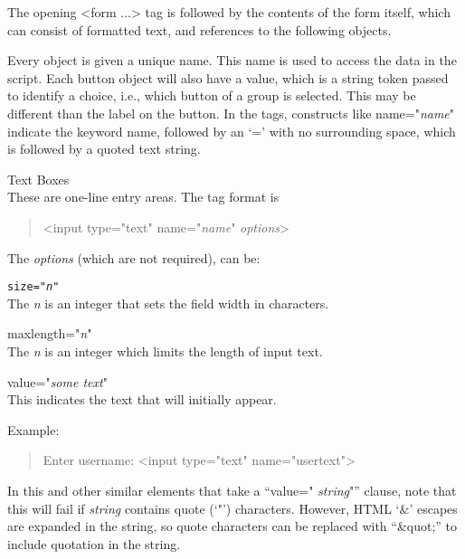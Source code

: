 The opening {\vt <form ...>} tag is followed by the contents of
the form itself, which can consist of formatted text, and references
to the following objects.

Every object is given a unique name.  This name is used to access the
data in the script.  Each button object will also have a value, which
is a string token passed to identify a choice, i.e., which button of a
group is selected.  This may be different than the label on the
button.  In the tags, constructs like {\vt name="{\it name}"} indicate
the keyword {\vt name}, followed by an `{\vt =}' with no surrounding
space, which is followed by a quoted text string.

\begin{description}
\item{Text Boxes}\\
These are one-line entry areas.  The tag format is
\begin{quote}
{\vt <input type="text" name="{\it name\/}" {\it options\/}>}
\end{quote}
The {\it options} (which are not required), can be:
\begin{description}
\item{\tt size="{\it n\/}"}\\
The {\it n} is an integer that sets the field width in characters.
\item{\vt maxlength="{\it n\/}"}\\
The {\it n} is an integer which limits the length of input text.
\item{\vt value="{\it some text\/}"}\\
This indicates the text that will initially appear.
\end{description}

Example:
\begin{quote}
{\vt Enter username: <input type="text" name="usertext">}
\end{quote}
\end{description}

In this and other similar elements that take a ``{\vt value="}{\it
string\/}{\vt "}'' clause, note that this will fail if {\it string}
contains quote (`{\vt "}') characters.  However, HTML `{\vt \&}'
escapes are expanded in the string, so quote characters can be
replaced with ``{\vt \&quot;}'' to include quotation in the string.

